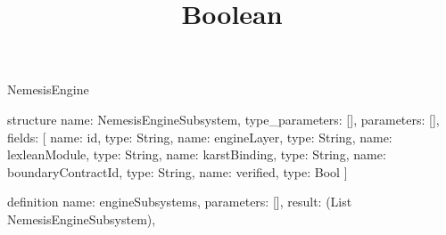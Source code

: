 \begin{lexlean}{NemesisEngine}
\title{Boolean}
\begin{semanticmodule}
structure{
  name: NemesisEngineSubsystem,
  type_parameters: [],
  parameters: [],
  fields: [
    {name: id, type: String},
    {name: engineLayer, type: String},
    {name: lexleanModule, type: String},
    {name: karstBinding, type: String},
    {name: boundaryContractId, type: String},
    {name: verified, type: Bool}
  ]
}

definition{
  name: engineSubsystems,
  parameters: [],
  result: (List NemesisEngineSubsystem),
}
\end{semanticmodule}
\end{lexlean}
